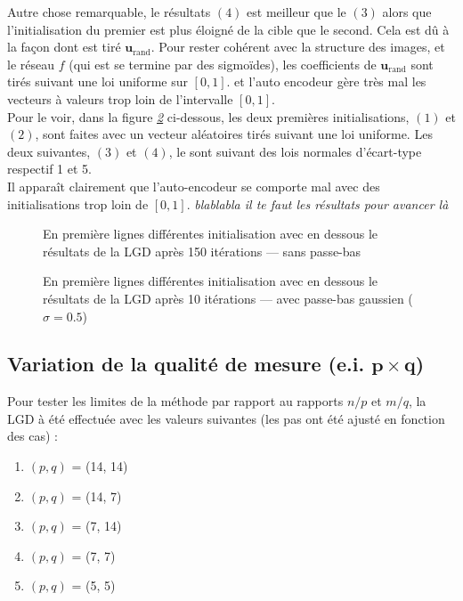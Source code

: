 \documentclass[hidelinks, french]{article} %
\renewcommand{\bf}[1]{\boldsymbol{#1}}
\theoremstyle{enonce}
\theoremstyle{special}
\theoremstyle{rq}
\theoremstyle{exo}
\theoremstyle{demo}
\begin{document}
Autre chose remarquable, le résultats $(4)$ est meilleur que le $(3)$ alors que l'initialisation du premier est plus éloigné de la cible que le second. Cela est dû à la façon dont est tiré $\bf{u}_{\text{rand}}$. Pour rester cohérent avec la structure des images, et le réseau $f$ (qui est se termine par des sigmoïdes), les coefficients de $\bf{u}_{\text{rand}}$ sont tirés suivant une loi uniforme sur $[0,1]$. et l'auto encodeur gère très mal les vecteurs à valeurs trop loin de l'intervalle $[0,1]$. 
\\

Pour le voir, dans la figure \textit{\ref{fig:LGDmultarg-g}} ci-dessous, les deux premières initialisations, $(1)$ et $(2)$, sont faites avec un vecteur aléatoires tirés suivant une loi uniforme. Les deux suivantes, $(3)$ et $(4)$, le sont suivant des lois normales d'écart-type respectif 1 et 5. 
\\
Il apparaît clairement que l'auto-encodeur se comporte mal avec des initialisations trop loin de $[0,1]$. \emph{blablabla il te faut les résultats pour avancer là}

\begin{figure}[H]\centering
	
    \caption{En première lignes différentes initialisation avec en dessous le résultats de la LGD après 150 itérations --- sans passe-bas}
    \label{fig:LGDmultarg-s}
\end{figure}
\begin{figure}[H]\centering
	
    \caption{En première lignes différentes initialisation avec en dessous le résultats de la LGD après 10 itérations ---  avec passe-bas gaussien ($\sigma=0.5$)}
    \label{fig:LGDmultarg-g}
\end{figure}







\subsection{Variation de la qualité de mesure (e.i. $\bf{p}\times\bf{q}$)}

Pour tester les limites de la méthode par rapport au rapports $n/p$ et $m/q$, la LGD à été effectuée avec les valeurs suivantes (les pas ont été ajusté en fonction des cas) :
\begin{enumerate}[label=(\arabic*)]
	\item $(p,q)$ = (14, 14)
	\item $(p,q)$ = (14, 7)
	\item $(p,q)$ = (7, 14)
	\item $(p,q)$ = (7, 7)
	\item $(p,q)$ = (5, 5)
\end{enumerate}
\end{document}
